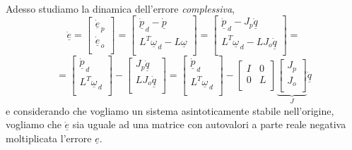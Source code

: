 \paragraph{}
Adesso studiamo la dinamica dell'errore \emph{complessiva}, 
\begin{equation*}
	\underline{\dot{e}} = 
	\begin{bmatrix}
		\underline{\dot{e}}_{\,p} \\
		\underline{\dot{e}}_{\,o} \\
	\end{bmatrix}
	=
	\begin{bmatrix}
		\underline{\dot{p}}_{\,d} - \underline{\dot{p}} \\
		L^T \underline{\omega}_{\,d} - L \underline{\omega} \\
	\end{bmatrix}
	= 
	\begin{bmatrix}
		\underline{\dot{p}}_{\,d} - J_p\underline{\dot{q}} \\
		L^T\underline{\omega}_{\,d} - LJ_o\underline{\dot{q}} \\
	\end{bmatrix}
	=
\end{equation*}
\begin{equation}
	=
	\begin{bmatrix}
		\underline{\dot{p}}_{\,d} \\
		L^T \underline{\omega}_{\,d} \\
	\end{bmatrix}
	-
	\begin{bmatrix}
		J_p\underline{\dot{q}} \\
		LJ_o\underline{\dot{q}} \\
	\end{bmatrix}
	 = 
	 \begin{bmatrix}
	 	\underline{\dot{p}}_{\,d} \\
		L^T \underline{\omega}_{\,d} \\
	 \end{bmatrix}
	 -
	 \begin{bmatrix}
	 	I & 0 \\
	 	0 & L \\
	 \end{bmatrix}
	 \underbrace{
	 \begin{bmatrix}
	 	J_p \\
	 	J_o \\
	 \end{bmatrix}
	 }_{J}
	 \underline{\dot{q}}
\end{equation}
e considerando che vogliamo un sistema asintoticamente stabile nell'origine, vogliamo che $\underline{\dot{e}}$ sia uguale ad una matrice con autovalori a parte reale negativa moltiplicata l'errore $\underline{e}$. 

